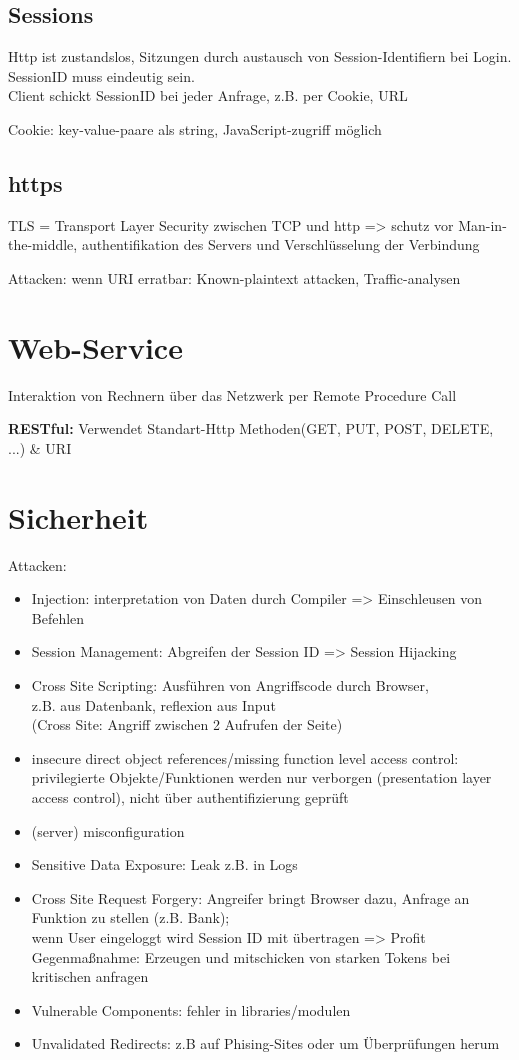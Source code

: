 \subsection{Sessions}
Http ist zustandslos, Sitzungen durch austausch von Session-Identifiern bei Login. \\
SessionID muss eindeutig sein. \\
Client schickt SessionID bei jeder Anfrage, z.B. per Cookie, URL

Cookie: key-value-paare als string, JavaScript-zugriff möglich
\subsection{https}
TLS = Transport Layer Security zwischen TCP und http => schutz vor Man-in-the-middle, authentifikation des Servers und Verschlüsselung der Verbindung

Attacken: wenn URI erratbar: Known-plaintext attacken,  Traffic-analysen
\section{Web-Service}
Interaktion von Rechnern über das Netzwerk per Remote Procedure Call

\textbf{RESTful:} Verwendet Standart-Http Methoden(GET, PUT, POST, DELETE, ...) \& URI
\section{Sicherheit}
Attacken:
\begin{itemize}
\item Injection: interpretation von Daten durch Compiler => Einschleusen von Befehlen
\item Session Management: Abgreifen der Session ID => Session Hijacking
\item Cross Site Scripting: Ausführen von Angriffscode durch Browser, \\
z.B. aus Datenbank, reflexion aus Input\\
(Cross Site: Angriff zwischen 2 Aufrufen der Seite)
\item insecure direct object references/missing function level access control: privilegierte Objekte/Funktionen werden nur verborgen (presentation layer access control), nicht über authentifizierung geprüft
\item (server) misconfiguration 
\item Sensitive Data Exposure: Leak z.B. in Logs
\item Cross Site Request Forgery: Angreifer bringt Browser dazu, Anfrage an Funktion zu stellen (z.B. Bank);\\ wenn User eingeloggt wird Session ID mit übertragen => Profit\\
Gegenmaßnahme: Erzeugen und mitschicken von starken Tokens bei kritischen anfragen
\item Vulnerable Components: fehler in libraries/modulen
\item Unvalidated Redirects: z.B auf Phising-Sites oder um Überprüfungen herum
\end{itemize}